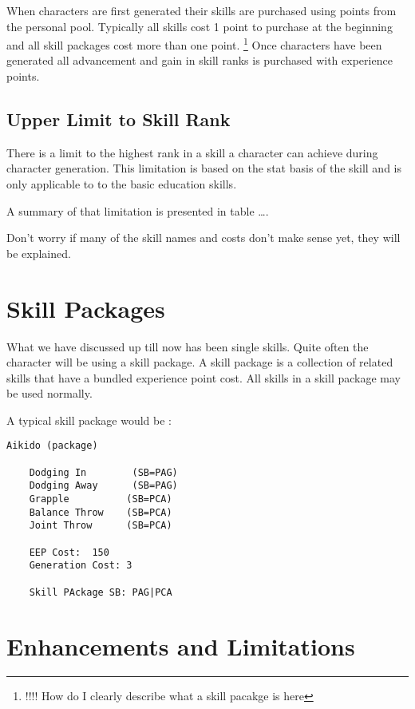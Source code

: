 When characters are first generated their skills are purchased
using points from the personal pool. Typically all skills cost 1 point 
to purchase at the beginning and all skill packages cost more than
one point.
\footnote{!!!! How do I clearly describe what a skill pacakge is here}
Once characters have been generated all advancement and gain in skill
ranks is purchased with experience points.

\subsection{Upper Limit to Skill Rank}

There is a limit to the highest rank in a skill a character can
achieve during character generation. This limitation
is based on the stat basis of the skill and is only applicable to to
the basic education skills.

A summary of that limitation is presented in table \dots.



Don't worry if many of the skill names and costs don't make sense
yet, they will be explained.

\section{Skill Packages}

What we have discussed up till now has been single skills.
Quite often the character will be using a skill package.
A skill package is a collection of related skills that have a bundled 
experience point cost. All skills in a skill package may be used 
normally.

A typical skill package would be :

\begin{verbatim}
Aikido (package)

	Dodging In		  (SB=PAG)
	Dodging Away	  (SB=PAG)
	Grapple			 (SB=PCA)
	Balance Throw	 (SB=PCA)
	Joint Throw		 (SB=PCA)

	EEP Cost:  150
	Generation Cost: 3

	Skill PAckage SB: PAG|PCA

\end{verbatim}

\section{Enhancements and Limitations}

